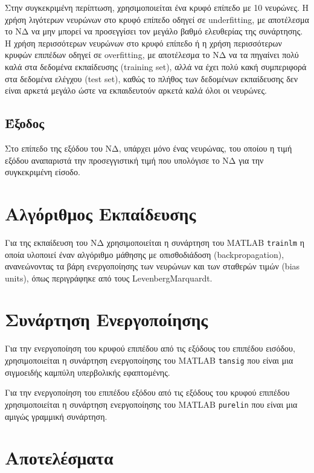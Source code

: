 \documentclass[11pt]{article}
\begin{document}
Στην συγκεκριμένη περίπτωση, χρησιμοποιείται ένα κρυφό επίπεδο με 10 νευρώνες. Η χρήση λιγότερων νευρώνων στο κρυφό επίπεδο οδηγεί σε underfitting, με αποτέλεσμα το ΝΔ να μην μπορεί να προσεγγίσει τον μεγάλο βαθμό ελευθερίας της συνάρτησης. Η χρήση περισσότερων νευρώνων στο κρυφό επίπεδο ή η χρήση περισσότερων κρυφών επιπέδων οδηγεί σε overfitting, με αποτέλεσμα το ΝΔ να τα πηγαίνει πολύ καλά στα δεδομένα εκπαίδευσης (training set), αλλά να έχει πολύ κακή συμπεριφορά στα δεδομένα ελέγχου (test set), καθώς το πλήθος των δεδομένων εκπαίδευσης δεν είναι αρκετά μεγάλο ώστε να εκπαιδευτούν αρκετά καλά όλοι οι νευρώνες.

\subsection{Έξοδος}

Στο επίπεδο της εξόδου του ΝΔ, υπάρχει μόνο ένας νευρώνας, του οποίου η τιμή εξόδου αναπαριστά την προσεγγιστική τιμή που υπολόγισε το ΝΔ για την συγκεκριμένη είσοδο.

\section{Αλγόριθμος Εκπαίδευσης}

Για της εκπαίδευση του ΝΔ χρησιμοποιείται η συνάρτηση του MATLAB \texttt{trainlm} η οποία υλοποιεί έναν αλγόριθμο μάθησης με οπισθοδιάδοση (backpropagation), ανανεώνοντας τα βάρη ενεργοποίησης των νευρώνων και των σταθερών τιμών (bias units), όπως περιγράφηκε από τους Levenberg\textendash Marquardt.

\section{Συνάρτηση Ενεργοποίησης}

Για την ενεργοποίηση του κρυφού επιπέδου από τις εξόδους του επιπέδου εισόδου, χρησιμοποιείται η συνάρτηση ενεργοποίησης του MATLAB \texttt{tansig} που είναι μια σιγμοειδής καμπύλη υπερβολικής εφαπτομένης.

Για την ενεργοποίηση του επιπέδου εξόδου από τις εξόδους του κρυφού επιπέδου χρησιμοποιείται η συνάρτηση ενεργοποίησης του MATLAB \texttt{purelin} που είναι μια αμιγώς γραμμική συνάρτηση.

\section{Αποτελέσματα}
\end{document}
